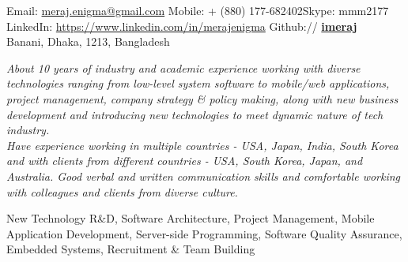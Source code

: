 \documentclass[10pt,a4paper]{article} %
\begin{document}
 



\noindent Email: \href{mailto:meraj.enigma@gmail.com}{meraj.enigma@gmail.com}\bull %
\textsmaller Mobile: {+} (880) 177-682402\bull Skype: mmm2177 \\ %
LinkedIn: \href{https://www.linkedin.com/in/merajenigma}{https://www.linkedin.com/in/merajenigma} \bull  Github:// \href{https://github.com/imeraj}{\bf imeraj} \\%
Banani, Dhaka, 1213, Bangladesh %

\spacedhrule{0.9em}{-0.4em} %



\vspace{-1.3em} %

\begin{multicols}{2}  %
\noindent \textit{About 10 years of industry and academic experience working with diverse technologies ranging from low-level system software to mobile/web applications, project management, company strategy \& policy making, along with new business development and introducing new technologies to meet dynamic nature of tech industry.\\
Have experience working in multiple countries - USA, Japan, India, South Korea and with clients from different countries - USA, South Korea, Japan, and Australia. Good verbal and written communication skills and comfortable working with colleagues and clients from diverse culture.}
\end{multicols}

 New Technology R\&D, Software Architecture, Project Management, Mobile Application Development, Server-side Programming, Software Quality Assurance, Embedded Systems, Recruitment \& Team Building\\
\end{document}
